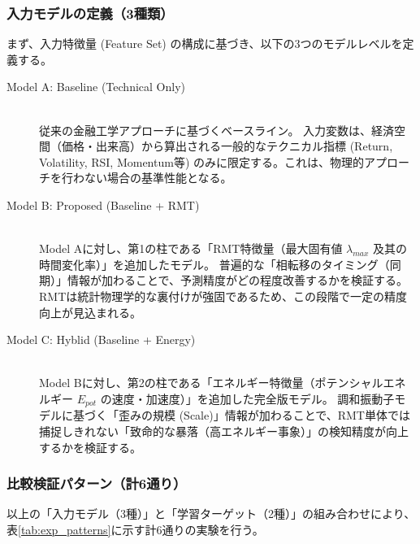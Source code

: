 \documentclass[11pt,a4paper,oneside]{ltjsarticle}
\begin{document}
\subsubsection{入力モデルの定義（3種類）}
まず、入力特徴量 (Feature Set) の構成に基づき、以下の3つのモデルレベルを定義する。

\begin{description}
    \item[Model A: Baseline (Technical Only)] \hfill \\
    従来の金融工学アプローチに基づくベースライン。
    入力変数は、経済空間（価格・出来高）から算出される一般的なテクニカル指標 (Return, Volatility, RSI, Momentum等) のみに限定する。これは、物理的アプローチを行わない場合の基準性能となる。

    \item[Model B: Proposed (Baseline + RMT)] \hfill \\
    Model Aに対し、第1の柱である「RMT特徴量（最大固有値 $\lambda_{max}$ 及其の時間変化率）」を追加したモデル。
    普遍的な「相転移のタイミング（同期）」情報が加わることで、予測精度がどの程度改善するかを検証する。RMTは統計物理学的な裏付けが強固であるため、この段階で一定の精度向上が見込まれる。

    \item[Model C: Hyblid (Baseline + Energy)] \hfill \\
    Model Bに対し、第2の柱である「エネルギー特徴量（ポテンシャルエネルギー $E_{pot}$ の速度・加速度）」を追加した完全版モデル。
    調和振動子モデルに基づく「歪みの規模 (Scale)」情報が加わることで、RMT単体では捕捉しきれない「致命的な暴落（高エネルギー事象）」の検知精度が向上するかを検証する。
\end{description}

\subsubsection{比較検証パターン（計6通り）}
以上の「入力モデル（3種）」と「学習ターゲット（2種）」の組み合わせにより、表\ref{tab:exp_patterns}に示す計6通りの実験を行う。
\end{document}
